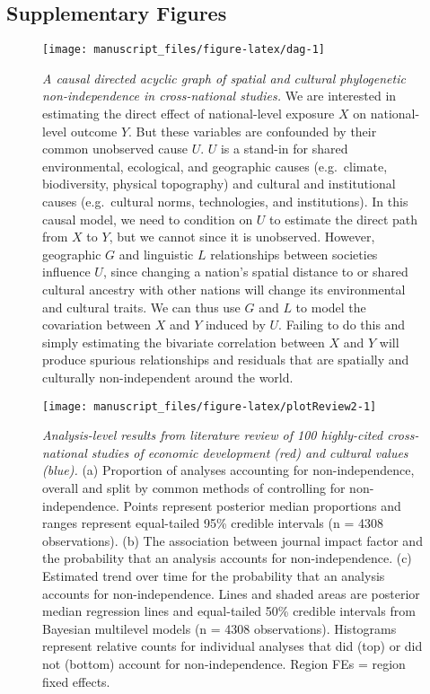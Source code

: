\documentclass[
  man,floatsintext]{apa6}
\begin{document}
\newpage

\hypertarget{supplementary-figures}{%
\subsection{Supplementary Figures}\label{supplementary-figures}}



\begin{figure}[H]
\texttt{[image: manuscript\_files/figure-latex/dag-1]} \caption{\emph{A causal directed acyclic graph of spatial and cultural phylogenetic non-independence in cross-national studies.} We are interested in estimating the direct effect of national-level exposure \(X\) on national-level outcome \(Y\). But these variables are confounded by their common unobserved cause \(U\). \(U\) is a stand-in for shared environmental, ecological, and geographic causes (e.g.~climate, biodiversity, physical topography) and cultural and institutional causes (e.g.~cultural norms, technologies, and institutions). In this causal model, we need to condition on \(U\) to estimate the direct path from \(X\) to \(Y\), but we cannot since it is unobserved. However, geographic \(G\) and linguistic \(L\) relationships between societies influence \(U\), since changing a nation's spatial distance to or shared cultural ancestry with other nations will change its environmental and cultural traits. We can thus use \(G\) and \(L\) to model the covariation between \(X\) and \(Y\) induced by \(U\). Failing to do this and simply estimating the bivariate correlation between \(X\) and \(Y\) will produce spurious relationships and residuals that are spatially and culturally non-independent around the world.}\label{fig:dag}
\end{figure}

\newpage



\begin{figure}[H]
\texttt{[image: manuscript\_files/figure-latex/plotReview2-1]} \caption{\emph{Analysis-level results from literature review of 100 highly-cited cross-national studies of economic development (red) and cultural values (blue).} (a) Proportion of analyses accounting for non-independence, overall and split by common methods of controlling for non-independence. Points represent posterior median proportions and ranges represent equal-tailed 95\% credible intervals (n = 4308 observations). (b) The association between journal impact factor and the probability that an analysis accounts for non-independence. (c) Estimated trend over time for the probability that an analysis accounts for non-independence. Lines and shaded areas are posterior median regression lines and equal-tailed 50\% credible intervals from Bayesian multilevel models (n = 4308 observations). Histograms represent relative counts for individual analyses that did (top) or did not (bottom) account for non-independence. Region FEs = region fixed effects.}\label{fig:plotReview2}
\end{figure}
\end{document}

